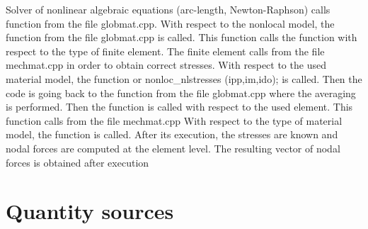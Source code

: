 Solver of nonlinear algebraic equations (arc-length, Newton-Raphson) calls function
 from the file {\sf globmat.cpp}.
\newline With respect to the nonlocal model, the function
 from the file {\sf globmat.cpp}
\newline is called. This function calls the function
\newline with respect to the type of finite element. The finite element calls
 from the file {\sf mechmat.cpp}
\newline in order to obtain correct stresses. With respect to the used material model, the function
 or {\sf nonloc\_nlstresses (ipp,im,ido);}
\newline is called. Then the code is going back to the function
 from the file {\sf globmat.cpp}
\newline where the averaging is performed. Then the function
\newline is called with respect to the used element. This function calls
 from the file {\sf mechmat.cpp}
\newline With respect to the type of material model, the function
\newline is called. After its execution, the stresses are known and nodal forces
are computed at the element level. The resulting vector of nodal forces is obtained
after execution

\section{Quantity sources}

